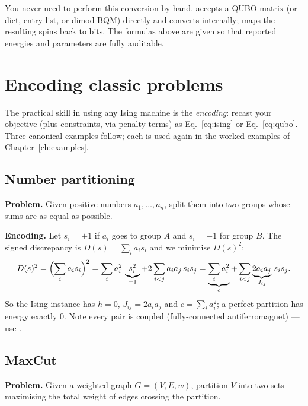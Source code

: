 \begin{notebox}
You never need to perform this conversion by hand.
 accepts a QUBO matrix (or dict, entry list, or dimod BQM)
directly and converts internally;  maps the resulting
spins back to bits. The formulas above are given so that reported energies
and parameters are fully auditable.
\end{notebox}

\section{Encoding classic problems}
\label{sec:encodings}

The practical skill in using any Ising machine is the \emph{encoding}: recast
your objective (plus constraints, via penalty terms) as
Eq.~\eqref{eq:ising} or Eq.~\eqref{eq:qubo}. Three canonical examples follow;
each is used again in the worked examples of Chapter~\ref{ch:examples}.

\subsection{Number partitioning}
\label{sec:numpart}

\textbf{Problem.} Given positive numbers $a_1,\dots,a_n$, split them into two
groups whose sums are as equal as possible.

\textbf{Encoding.} Let $s_i=+1$ if $a_i$ goes to group $A$ and $s_i=-1$ for
group $B$. The signed discrepancy is $D(s)=\sum_i a_i s_i$ and we minimise
$D(s)^2$:
\begin{equation}
D(s)^2=\Bigl(\sum_i a_i s_i\Bigr)^2
=\sum_i a_i^2\,\underbrace{s_i^2}_{=1} + 2\sum_{i<j}a_ia_j\,s_is_j
=\underbrace{\sum_i a_i^2}_{c} + \sum_{i<j}\underbrace{2a_ia_j}_{J_{ij}}\,s_is_j .
\end{equation}
So the Ising instance has $h=0$, $J_{ij}=2a_ia_j$ and $c=\sum_ia_i^2$; a
perfect partition has energy exactly $0$. Note every pair is coupled
(fully-connected antiferromagnet) --- use .

\subsection{MaxCut}
\label{sec:maxcut}

\textbf{Problem.} Given a weighted graph $G=(V,E,w)$, partition $V$ into two
sets maximising the total weight of edges crossing the partition.

